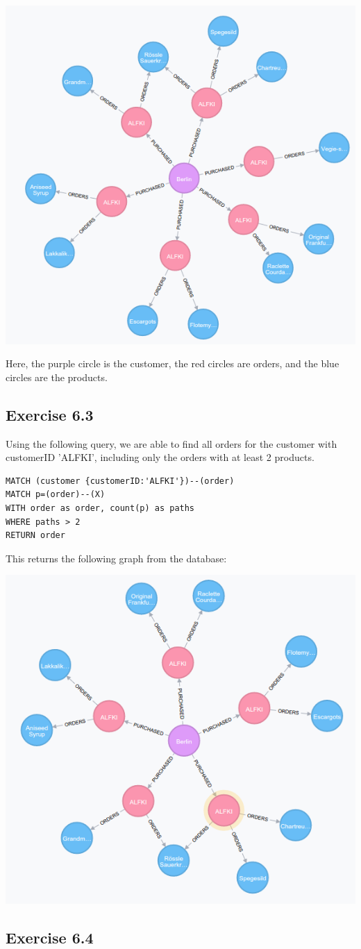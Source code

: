 \documentclass{article}
\begin{document}
\includegraphics[scale=0.5]{6_2.png}

Here, the purple circle is the customer, the red circles are orders, and the blue
circles are the products.


\subsection{Exercise 6.3}
\label{sub:Exercise 6.3}

Using the following query, we are able to find all orders for the customer with
customerID 'ALFKI', including only the orders with at least 2 products.

\begin{lstlisting}
MATCH (customer {customerID:'ALFKI'})--(order)
MATCH p=(order)--(X)
WITH order as order, count(p) as paths
WHERE paths > 2
RETURN order
\end{lstlisting}

This returns the following graph from the database:

\includegraphics[scale=0.5]{6_3.png}

\subsection{Exercise 6.4}
\label{sub:Exercise 6.4}
\end{document}
